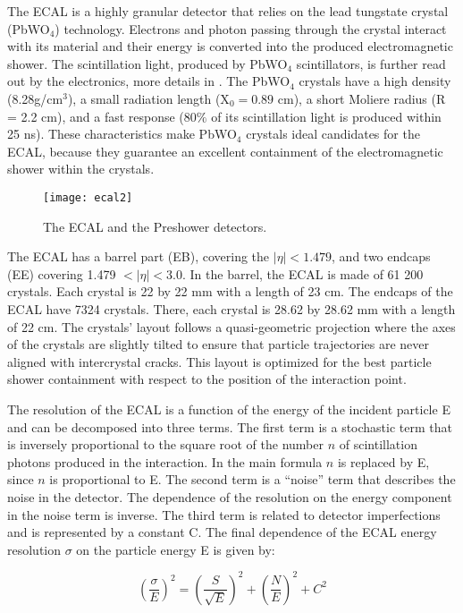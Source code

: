 \begin{normalsize}
The ECAL is a highly granular detector that relies on the lead tungstate crystal (PbWO$_4$) technology. Electrons and photon passing through the crystal interact with its material and their energy is converted into the produced electromagnetic shower. The scintillation light, produced by PbWO$_4$ scintillators, is further read out by the electronics, more details in \cite{CMS_TDR}. The PbWO$_4$ crystals have a high density (8.28g/cm$^3$), a small radiation length (X$_0 = 0.89$ cm), a short Moliere radius (R = 2.2 cm), and a fast response (80$\%$ of its scintillation light is produced within 25 ns). These characteristics make PbWO$_4$ crystals ideal candidates for the ECAL, because they guarantee an excellent containment of the electromagnetic shower within the crystals. 



\begin{figure}[H]
  \centering
  \texttt{[image: ecal2]}
  \caption[The ECAL]{The ECAL and the Preshower detectors.}
  \label{ecal2}
\end{figure}

The ECAL has a barrel part (EB), covering the $|\eta|< 1.479$, and two endcaps (EE) covering 1.479 $< |\eta |  < 3.0$. In the barrel, the ECAL is made of 61 200 crystals. Each crystal is 22 by 22 mm with a length of 23 cm. The endcaps of the ECAL have 7324 crystals. There, each crystal is 28.62 by 28.62 mm with a length of 22 cm. The crystals' layout follows a quasi-geometric projection where the axes of the crystals are slightly tilted to ensure that particle trajectories are never aligned with intercrystal cracks. This layout is optimized for the best particle shower containment with respect to the position of the interaction point.  

The resolution of the ECAL is a function of the energy of the incident particle E and can be decomposed into three terms. The first term is a stochastic term that is inversely proportional to the square root of the number $n$ of scintillation photons produced in the interaction. In the main formula $n$ is replaced by E, since $n$ is proportional to E. The second term is a ``noise'' term that describes the noise in the detector. The dependence of the resolution on the energy component in the noise term is inverse. The third term is related to detector imperfections and is represented by a constant C. The final dependence of the ECAL energy resolution $\sigma$ on the particle energy E is given by:

  
\begin{equation}
  \left(\frac{\sigma}{E}\right)^2 = \left(\frac{S}{\sqrt{E}}\right)^2 +
  \left(\frac{N}{E}\right)^2 + C^2
  \label{eq:ecal}
\end{equation}


\end{normalsize}
